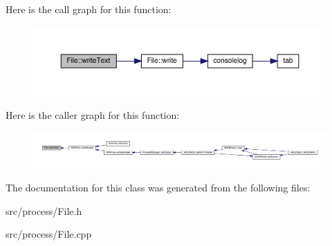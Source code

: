 Here is the call graph for this function\+:
\nopagebreak
\begin{figure}[H]
\begin{center}
\leavevmode
\includegraphics[width=350pt]{class_file_a156d4a3d1e12e9ddf9c4948cae8c9734_cgraph}
\end{center}
\end{figure}
Here is the caller graph for this function\+:
\nopagebreak
\begin{figure}[H]
\begin{center}
\leavevmode
\includegraphics[width=350pt]{class_file_a156d4a3d1e12e9ddf9c4948cae8c9734_icgraph}
\end{center}
\end{figure}


The documentation for this class was generated from the following files\+:\begin{DoxyCompactItemize}
\item 
src/process/File.\+h\item 
src/process/File.\+cpp\end{DoxyCompactItemize}
